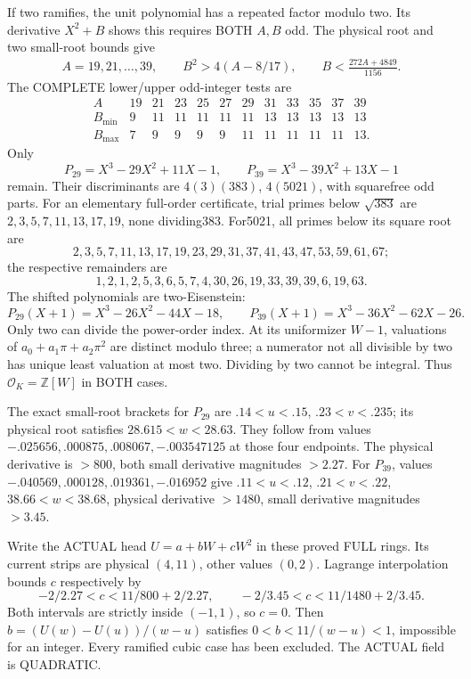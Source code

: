 \documentclass[11pt]{article}
\begin{document}
If two ramifies, the unit polynomial has a
repeated factor modulo two.
Its derivative \(X^2+B\) shows this requires
BOTH \(A,B\) odd.
The physical root and two small-root bounds give
\[
 \begin{gathered}
 A=19,21,\ldots,39,\qquad
 B^2>4(A-8/17),\qquad
 B<{\frac{272A+4849}{1156}}.
 \end{gathered}
\]
The COMPLETE lower/upper odd-integer tests are
\[
\begin{array}{c|rrrrrrrrrrr}
 A&19&21&23&25&27&29&31&33&35&37&39\\ \hline
 B_{\min}&9&11&11&11&11&11&13&13&13&13&13\\
 B_{\max}&7&9&9&9&9&11&11&11&11&11&13 .
\end{array}
\]
Only
\[
                   P_{29}=X^3-29X^2+11X-1,\qquad
                   P_{39}=X^3-39X^2+13X-1
\]
remain.
Their discriminants are \(4(3)(383)\),
\(4(5021)\), with squarefree odd parts.
For an elementary full-order certificate,
trial primes below \(\sqrt{383}\) are
\(2,3,5,7,11,13,17,19\), none dividing383.
For5021, all primes below its square root are
\[
2,3,5,7,11,13,17,19,23,29,31,37,41,43,47,53,59,61,67;
\]
the respective remainders are
\[
1,2,1,2,5,3,6,5,7,4,30,26,19,33,39,39,6,19,63 .
\]
The shifted polynomials are two-Eisenstein:
\[
 P_{29}(X+1)=X^3-26X^2-44X-18,\qquad
 P_{39}(X+1)=X^3-36X^2-62X-26 .
\]
Only two can divide the power-order index.
At its uniformizer \(W-1\), valuations of
\(a_0+a_1\pi+a_2\pi^2\) are distinct modulo
three; a numerator not all divisible by two
has unique least valuation at most two.
Dividing by two cannot be integral.
Thus \(\mathcal O_K=\mathbb Z[W]\) in BOTH cases.

The exact small-root brackets for \(P_{29}\)
are \(.14<u<.15\), \(.23<v<.235\);
its physical root satisfies \(28.615<w<28.63\).
They follow from values
\(-.025656,.000875,.008067,-.003547125\)
at those four endpoints.
The physical derivative is \(>800\), both
small derivative magnitudes \(>2.27\).
For \(P_{39}\), values
\(-.040569,.000128,.019361,-.016952\)
give \(.11<u<.12\), \(.21<v<.22\),
\(38.66<w<38.68\), physical derivative \(>1480\),
small derivative magnitudes \(>3.45\).

Write the ACTUAL head \(U=a+bW+cW^2\) in
these proved FULL rings.
Its current strips are physical \((4,11)\),
other values \((0,2)\).
Lagrange interpolation bounds \(c\) respectively by
\[
             -2/2.27<c<11/800+2/2.27,\qquad
             -2/3.45<c<11/1480+2/3.45 .
\]
Both intervals are strictly inside \((-1,1)\),
so \(c=0\).
Then \(b=(U(w)-U(u))/(w-u)\) satisfies
\(0<b<11/(w-u)<1\), impossible for an integer.
Every ramified cubic case has been excluded.
The ACTUAL field is QUADRATIC.
\end{document}
